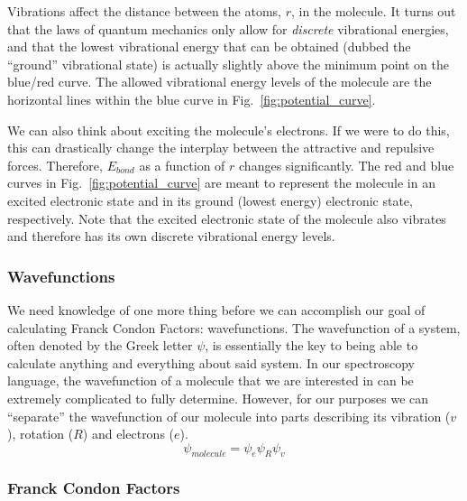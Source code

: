\documentclass[12pt]{article}
\begin{document}
Vibrations affect the distance between the atoms, $r$, in the molecule. It turns out that the laws of quantum mechanics only allow for \textit{discrete} vibrational energies, and that the lowest vibrational energy that can be obtained (dubbed the ``ground'' vibrational state) is actually slightly above the minimum point on the blue/red curve. The allowed vibrational energy levels of the molecule are the horizontal lines within the blue curve in Fig.~\ref{fig:potential_curve}.

We can also think about exciting the molecule's electrons. If we were to do this, this can drastically change the interplay between the attractive and repulsive forces. Therefore, $E_{bond}$ as a function of $r$ changes significantly. The red and blue curves in Fig.~\ref{fig:potential_curve} are meant to represent the molecule in an excited electronic state and in its ground (lowest energy) electronic state, respectively. Note that the excited electronic state of the molecule also vibrates and therefore has its own discrete vibrational energy levels.

\subsubsection{Wavefunctions}

We need knowledge of one more thing before we can accomplish our goal of calculating Franck Condon Factors: wavefunctions. The wavefunction of a system, often denoted by the Greek letter $\psi$, is essentially the key to being able to calculate anything and everything about said system. In our spectroscopy language, the wavefunction of a molecule that we are interested in can be extremely complicated to fully determine. However, for our purposes we can ``separate'' the wavefunction of our molecule into parts describing its vibration ($v$), rotation ($R$) and electrons ($e$).
\begin{equation}
    \psi_{molecule} = \psi_e\psi_R\psi_v
\end{equation}

\subsubsection{Franck Condon Factors}
\end{document}
